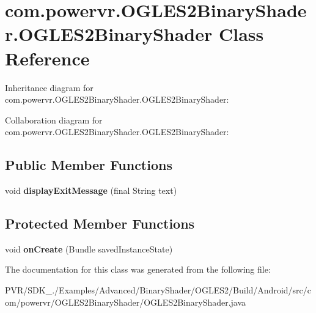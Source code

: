 \hypertarget{classcom_1_1powervr_1_1_o_g_l_e_s2_binary_shader_1_1_o_g_l_e_s2_binary_shader}{\section{com.\+powervr.\+O\+G\+L\+E\+S2\+Binary\+Shader.\+O\+G\+L\+E\+S2\+Binary\+Shader Class Reference}
\label{classcom_1_1powervr_1_1_o_g_l_e_s2_binary_shader_1_1_o_g_l_e_s2_binary_shader}
}


Inheritance diagram for com.\+powervr.\+O\+G\+L\+E\+S2\+Binary\+Shader.\+O\+G\+L\+E\+S2\+Binary\+Shader\+:


Collaboration diagram for com.\+powervr.\+O\+G\+L\+E\+S2\+Binary\+Shader.\+O\+G\+L\+E\+S2\+Binary\+Shader\+:
\subsection*{Public Member Functions}
\begin{DoxyCompactItemize}
\item 
\hypertarget{classcom_1_1powervr_1_1_o_g_l_e_s2_binary_shader_1_1_o_g_l_e_s2_binary_shader_a9fa07bcf99ff19b32ae55ebd645d268a}{void {\bfseries display\+Exit\+Message} (final String text)}\label{classcom_1_1powervr_1_1_o_g_l_e_s2_binary_shader_1_1_o_g_l_e_s2_binary_shader_a9fa07bcf99ff19b32ae55ebd645d268a}

\end{DoxyCompactItemize}
\subsection*{Protected Member Functions}
\begin{DoxyCompactItemize}
\item 
\hypertarget{classcom_1_1powervr_1_1_o_g_l_e_s2_binary_shader_1_1_o_g_l_e_s2_binary_shader_a79d79d86de57ec3878d04e2005259688}{void {\bfseries on\+Create} (Bundle saved\+Instance\+State)}\label{classcom_1_1powervr_1_1_o_g_l_e_s2_binary_shader_1_1_o_g_l_e_s2_binary_shader_a79d79d86de57ec3878d04e2005259688}

\end{DoxyCompactItemize}


The documentation for this class was generated from the following file\+:\begin{DoxyCompactItemize}
\item 
P\+V\+R/\+S\+D\+K\+\_./\+Examples/\+Advanced/\+Binary\+Shader/\+O\+G\+L\+E\+S2/\+Build/\+Android/src/com/powervr/\+O\+G\+L\+E\+S2\+Binary\+Shader/O\+G\+L\+E\+S2\+Binary\+Shader.\+java\end{DoxyCompactItemize}
